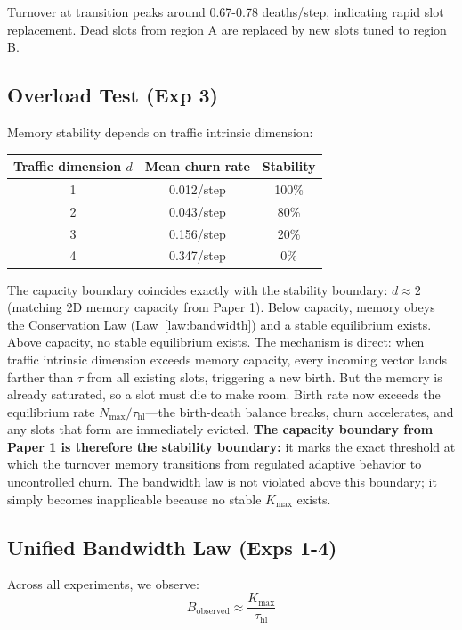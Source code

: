\documentclass[11pt]{article}
\begin{document}
Turnover at transition peaks around 0.67-0.78 deaths/step, indicating rapid slot replacement. Dead slots from region A are replaced by new slots tuned to region B.

\subsection{Overload Test (Exp 3)}

Memory stability depends on traffic intrinsic dimension:
\begin{center}
\begin{tabular}{ccc}
\toprule
Traffic dimension $d$ & Mean churn rate & Stability \\
\midrule
1 & 0.012/step & 100\% \\
2 & 0.043/step & 80\% \\
3 & 0.156/step & 20\% \\
4 & 0.347/step & 0\% \\
\bottomrule
\end{tabular}
\end{center}

The capacity boundary coincides exactly with the stability boundary: $d \approx 2$
(matching 2D memory capacity from Paper 1).
Below capacity, memory obeys the Conservation Law (Law~\ref{law:bandwidth}) and a stable equilibrium exists.
Above capacity, no stable equilibrium exists.
The mechanism is direct: when traffic intrinsic dimension exceeds memory capacity,
every incoming vector lands farther than $\tau$ from all existing slots,
triggering a new birth. But the memory is already saturated, so a slot must die to make room.
Birth rate now exceeds the equilibrium rate $N_{\max}/\tau_{\text{hl}}$---the birth-death
balance breaks, churn accelerates, and any slots that form are immediately evicted.
\textbf{The capacity boundary from Paper 1 is therefore the stability boundary:}
it marks the exact threshold at which the turnover memory transitions from regulated
adaptive behavior to uncontrolled churn. The bandwidth law is not violated above this boundary;
it simply becomes inapplicable because no stable $K_{\max}$ exists.

\subsection{Unified Bandwidth Law (Exps 1-4)}

Across all experiments, we observe:
\[
  B_{\text{observed}} \approx \frac{K_{\max}}{\tau_{\text{hl}}}
\]
\end{document}
